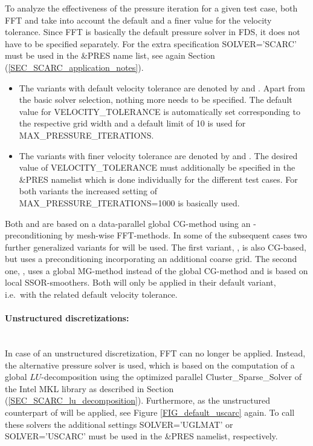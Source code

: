 To analyze the effectiveness of the pressure iteration for a given test case, both FFT and \scarc{} take into account the default and a finer value for the velocity tolerance. Since FFT is basically the default pressure solver in FDS, it does not have to be specified separately.
For \scarc{} the extra specification {\ct SOLVER='SCARC'} must be used in the {\ct \&PRES} name list, see
again Section (\ref{SEC_SCARC_application_notes}).

\begin{itemize}
\item The variants with default velocity tolerance are denoted by \fftdefault{} and \scarcdefault{}. Apart from the basic solver selection, nothing more needs to be specified. The default value for {\ct VELOCITY\_TOLERANCE} is automatically set corresponding to the respective grid width and a default limit of 10 is used for  {\ct MAX\_PRESSURE\_ITERATIONS}. 
\item The variants with finer velocity tolerance are denoted by \ffttight{} and \scarctight{}. The desired value of {\ct VELOCITY\_TOLERANCE} must additionally be specified in the {\ct \&PRES} namelist which is done individually for the different test cases. For both variants the increased setting of {\ct MAX\_PRESSURE\_ITERATIONS=1000} is basically used.
\end{itemize}
%
Both \scarcdefault{} and \scarctight{} are based on a data-parallel global CG-method using an \ols{}-preconditioning by mesh-wise FFT-methods.
In some of the subsequent cases two further generalized variants for \scarc{} will be used. The first variant, \scarctwolevel{}, is also CG-based, but uses a \tls{} preconditioning incorporating an additional coarse grid. The second one, \scarcmultigrid{}, uses a global MG-method instead of the global CG-method and is based on local SSOR-smoothers. Both will only be applied in their default variant, i.e.\ with the related default velocity tolerance.

\paragraph{Unstructured discretizations:} \mbox{} \\[1ex]
In case of an unstructured discretization, FFT can no longer be applied. 
Instead, the alternative pressure solver \uglmat{} is used, which is based on the computation of a global $LU$-decomposition using the optimized parallel {\ct Cluster\_Sparse\_Solver} of the Intel\textsuperscript{\textregistered} MKL library as described in Section (\ref{SEC_SCARC_lu_decomposition}).
Furthermore, \uscarc{} as the unstructured counterpart of \scarc{} will be applied, see Figure \ref{FIG_default_uscarc} again.
To call these solvers the additional settings  {\ct SOLVER='UGLMAT'} or {\ct SOLVER='USCARC'} must be used in the {\ct \&PRES} namelist, respectively.

